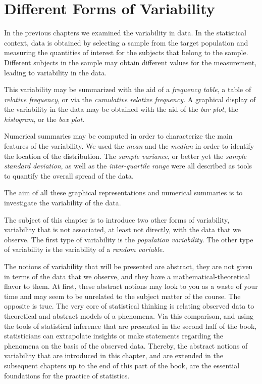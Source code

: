 \documentclass[
]{krantz}
\theoremstyle{definition}
\theoremstyle{definition}
\theoremstyle{definition}
\theoremstyle{remark}
\begin{document}
\hypertarget{different-forms-of-variability}{%
\section{Different Forms of Variability}\label{different-forms-of-variability}}

In the previous chapters we examined the variability in data. In the
statistical context, data is obtained by selecting a sample from the
target population and measuring the quantities of interest for the
subjects that belong to the sample. Different subjects in the sample may
obtain different values for the measurement, leading to variability in
the data.

This variability may be summarized with the aid of a \emph{frequency table},
a table of \emph{relative frequency}, or via the \emph{cumulative relative
frequency}. A graphical display of the variability in the data may be
obtained with the aid of the \emph{bar plot}, the \emph{histogram}, or the \emph{box
plot}.

Numerical summaries may be computed in order to characterize the main
features of the variability. We used the \emph{mean} and the \emph{median} in
order to identify the location of the distribution. The \emph{sample
variance}, or better yet the \emph{sample standard deviation}, as well as the
\emph{inter-quartile range} were all described as tools to quantify the
overall spread of the data.

The aim of all these graphical representations and numerical summaries
is to investigate the variability of the data.

The subject of this chapter is to introduce two other forms of
variability, variability that is not associated, at least not directly,
with the data that we observe. The first type of variability is the
\emph{population variability}. The other type of variability is the
variability of a \emph{random variable}.

The notions of variability that will be presented are abstract, they are
not given in terms of the data that we observe, and they have a
mathematical-theoretical flavor to them. At first, these abstract
notions may look to you as a waste of your time and may seem to be
unrelated to the subject matter of the course. The opposite is true. The
very core of statistical thinking is relating observed data to
theoretical and abstract models of a phenomena. Via this comparison, and
using the tools of statistical inference that are presented in the
second half of the book, statisticians can extrapolate insights or make
statements regarding the phenomena on the basis of the observed data.
Thereby, the abstract notions of variability that are introduced in this
chapter, and are extended in the subsequent chapters up to the end of
this part of the book, are the essential foundations for the practice of
statistics.
\end{document}
